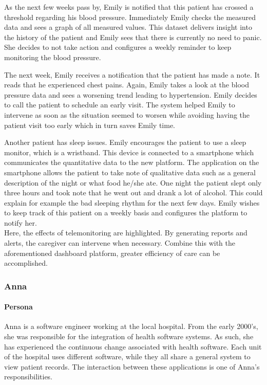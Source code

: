         As the next few weeks pass by, Emily is notified that this patient has crossed a threshold regarding his blood pressure. Immediately Emily checks the measured data and sees a graph of all measured values. This dataset delivers insight into the history of the patient and Emily sees that there is currently no need to panic. She decides to not take action and configures a weekly reminder to keep monitoring the blood pressure.
        
        The next week, Emily receives a notification that the patient has made a note. It reads that he experienced chest pains. Again, Emily takes a look at the blood pressure data and sees a worsening trend leading to hypertension. Emily decides to call the patient to schedule an early visit. The system helped Emily to intervene as soon as the situation seemed to worsen while avoiding having the patient visit too early which in turn saves Emily time.
        
        Another patient has sleep issues. Emily encourages the patient to use a sleep monitor, which is a wristband. This device is connected to a smartphone which communicates the quantitative data to the new platform. The application on the smartphone allows the patient to take note of qualitative data such as a general description of the night or what food he/she ate. One night the patient slept only three hours and took note that he went out and drank a lot of alcohol. This could explain for example the bad sleeping rhythm for the next few days. Emily wishes to keep track of this patient on a weekly basis and configures the platform to notify her.\\

        \noindent Here, the effects of telemonitoring are highlighted. By generating reports and alerts, the caregiver can intervene when necessary. Combine this with the aforementioned dashboard platform, greater efficiency of care can be accomplished.

        \subsubsection{Anna}

        \paragraph{Persona} Anna is a software engineer working at the local hospital. From the early 2000's, she was responsible for the integration of health software systems. As such, she has experienced the continuous change associated with health software. Each unit of the hospital uses different software, while they all share a general system to view patient records. The interaction between these applications is one of Anna's responsibilities.

